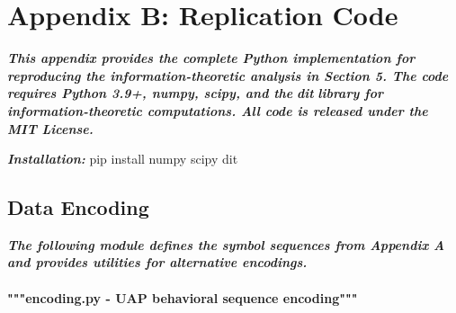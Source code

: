 \documentclass[11pt,letterpaper]{article}
\begin{document}
\begin{table}[H]
\centering
\small
{}
\caption*{\small\textit{Table A7. Pooled dataset summary. Conservative encoding: 28 paired steps. Alternative encodings yield 35--50+ steps depending on decomposition decisions.}}
\end{table}


\newpage
\section*{Appendix B: Replication Code}

\textbf{\textit{This appendix provides the complete Python implementation for reproducing the information-theoretic analysis in Section 5. The code requires Python 3.9+, numpy, scipy, and the }}\textbf{\textit{dit}}\textbf{\textit{ library for information-theoretic computations. All code is released under the MIT License.}}


\textbf{\textit{Installation: }}pip install numpy scipy dit


\subsection*{Data Encoding}

\textbf{\textit{The following module defines the symbol sequences from Appendix A and provides utilities for alternative encodings.}}


\paragraph{"""encoding.py - UAP behavioral sequence encoding"""}
\end{document}
